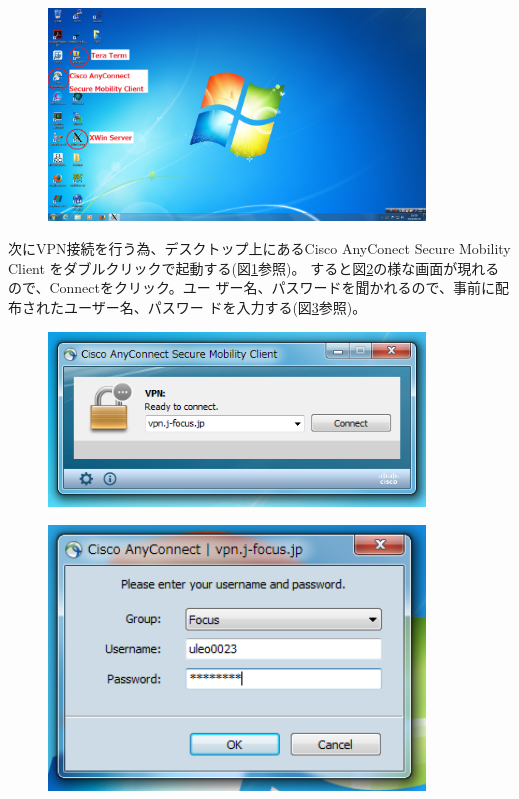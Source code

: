 \documentclass[12pt,a4paper,dvipdfmx]{jarticle}
\begin{document}
\begin{figure}
  \begin{center}
    \includegraphics[clip, width=10.0cm]{./fig/x11appear_.png}
  \end{center}
  \caption{}
  \label{fig:x11appear}
\end{figure}

次にVPN接続を行う為、デスクトップ上にあるCisco AnyConect Secure
Mobility Client をダブルクリックで起動する(図\ref{fig:x11appear}参照)。
すると図\ref{fig:cisco}の様な画面が現れるので、Connectをクリック。ユー
ザー名、パスワードを聞かれるので、事前に配布されたユーザー名、パスワー
ドを入力する(図\ref{fig:cisco_connect}参照)。

\begin{figure}
  \begin{center}
    \includegraphics[clip, width=10.0cm]{./fig/cisco_.png}
  \end{center}
  \caption{}
  \label{fig:cisco}
\end{figure}

\begin{figure}
  \begin{center}
    \includegraphics[clip, width=10.0cm]{./fig/cisco_connect_.png}
  \end{center}
  \caption{}
  \label{fig:cisco_connect}
\end{figure}
\end{document}
